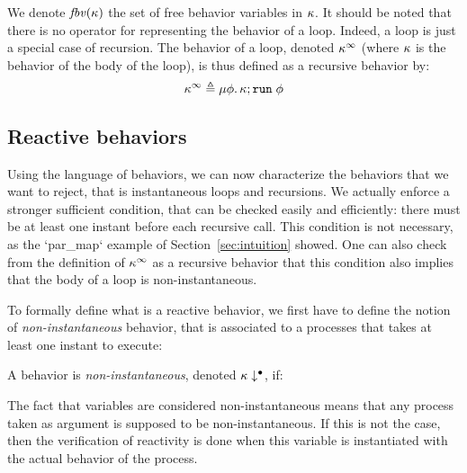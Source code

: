 \documentclass[9pt,preprint]{sigplanconf}
\newcommand{\deq}{\triangleq}
\begin{document}
We denote $\mathit{fbv}(\kappa)$ the set of free behavior variables in $\kappa$. It should be noted that there is no operator for representing the behavior of a loop. Indeed, a loop is just a special case of recursion. The behavior of a loop, denoted $\kappa^\infty$ (where $\kappa$ is the behavior of the body of the loop), is thus defined as a recursive behavior by:
\[\effinf{\rk} \deq \effrec{\effvar}{\effcon{\rk}{\effrun{\effvar}}} \]

%
%
%
%
%


\subsection{Reactive behaviors}
\label{sec:reactive_behavior}

Using the language of behaviors, we can now characterize the behaviors that we want to reject, that is instantaneous loops and recursions. We actually enforce a stronger sufficient condition, that can be checked easily and efficiently: there must be at least one instant before each recursive call. This condition is not necessary, as the `par_map` example of Section~\ref{sec:intuition} showed. One can also check from the definition of $\kappa^\infty$ as a recursive behavior that this condition also implies that the body of a loop is non-instantaneous.

To formally define what is a reactive behavior, we first have to define the notion of \emph{non-instantaneous} behavior, that is associated to a processes that takes at least one instant to execute:
\begin{definition}
A behavior is \emph{non-instantaneous}, denoted $\kappa\downarrow^{\bullet}$, if:

\end{definition}
The fact that variables are considered non-instantaneous means that any process taken as argument is supposed to be non-instantan\-eous. If this is not the case, then the verification of reactivity is done when this variable is instantiated with the actual behavior of the process.
\end{document}
